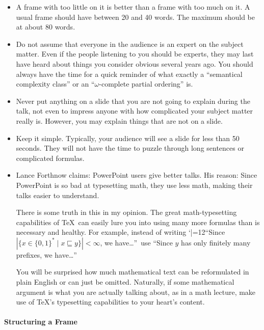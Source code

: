 \begin{itemize}
\item
  A frame with too little on it is better than a frame with too much
  on it. A usual frame should have between 20 and 40 words. The
  maximum should be at about 80 words.
\item
  Do not assume that everyone in the audience is an expert on the
  subject matter. Even if the
  people listening to you should be experts, they may last have heard
  about things you consider obvious several years ago. You should
  always have the time for a quick reminder of what exactly a
  ``semantical complexity class'' or an ``$\omega$-complete partial
  ordering'' is.
\item
  Never put anything on a slide that you are not going to explain
  during the talk, not even to impress anyone with how
    complicated your subject matter really is. However, you may
  explain things that are not on a slide.
\item
  Keep it simple. Typically, your audience will see a slide for less
  than 50 seconds. They will not have the time to puzzle through long
  sentences or complicated formulas.
\item
  Lance Forthnow claims: PowerPoint users give better talks. His
  reason: Since PowerPoint is so bad at typesetting math, they use
  less math, making their talks easier to understand.

  There is some truth in this in my opinion. The great
  math-typesetting capabilities of \TeX\ can easily lure you into
  using many more formulas than is necessary and healthy. For example,
  instead of writing {\catcode `|=12``Since $\left|\{x \in \{0,1\}^*
  \mid x \sqsubseteq y\}\right| < \infty$}, we have\dots''\ use ``Since
  $y$ has only finitely many prefixes, we have\dots''

  You will be surprised how much mathematical text can be reformulated
  in plain English or can just be omitted. Naturally, if some
  mathematical argument is what you are actually talking about, as in
  a math lecture, make use of \TeX's typesetting capabilities to your
  heart's content. 
\end{itemize}



\paragraph{Structuring a Frame}

